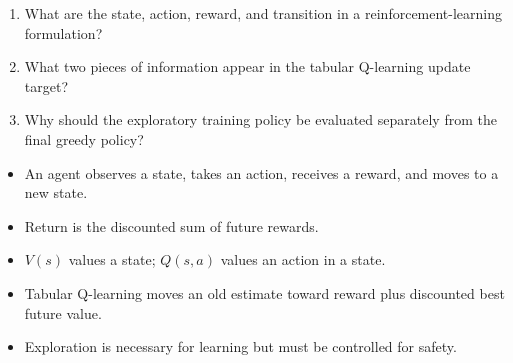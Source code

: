 

\begin{quickcheck}
\begin{enumerate}
  \item What are the state, action, reward, and transition in a reinforcement-learning formulation?
  \item What two pieces of information appear in the tabular Q-learning update target?
  \item Why should the exploratory training policy be evaluated separately from the final greedy policy?
\end{enumerate}
\end{quickcheck}

\begin{chapterrecap}
\begin{itemize}
  \item An agent observes a state, takes an action, receives a reward, and moves to a new state.
  \item Return is the discounted sum of future rewards.
  \item $V(s)$ values a state; $Q(s,a)$ values an action in a state.
  \item Tabular Q-learning moves an old estimate toward reward plus discounted best future value.
  \item Exploration is necessary for learning but must be controlled for safety.
\end{itemize}
\end{chapterrecap}
